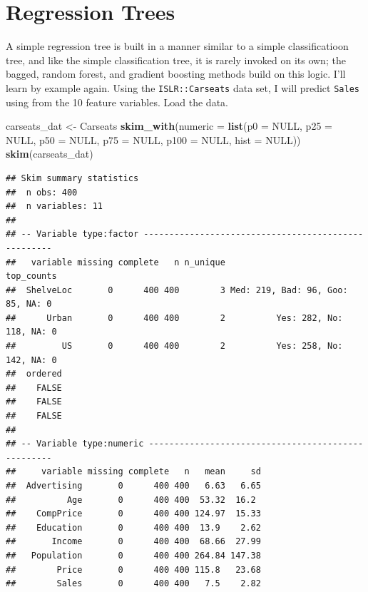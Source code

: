 \documentclass[]{book}
\newenvironment{Shaded}{\begin{snugshade}}{\end{snugshade}}
\newcommand{\DataTypeTok}[1]{\textcolor[rgb]{0.13,0.29,0.53}{#1}}
\newcommand{\KeywordTok}[1]{\textcolor[rgb]{0.13,0.29,0.53}{\textbf{#1}}}
\newcommand{\NormalTok}[1]{#1}
\newcommand{\OtherTok}[1]{\textcolor[rgb]{0.56,0.35,0.01}{#1}}
\newcommand{\StringTok}[1]{\textcolor[rgb]{0.31,0.60,0.02}{#1}}
\begin{document}
\hypertarget{regression-trees}{%
\section{Regression Trees}\label{regression-trees}}

A simple regression tree is built in a manner similar to a simple classificatioon tree, and like the simple classification tree, it is rarely invoked on its own; the bagged, random forest, and gradient boosting methods build on this logic. I'll learn by example again. Using the \texttt{ISLR::Carseats} data set, I will predict \texttt{Sales} using from the 10 feature variables. Load the data.

\begin{Shaded}
\begin{Highlighting}[]
\NormalTok{carseats_dat <-}\StringTok{ }\NormalTok{Carseats}
\KeywordTok{skim_with}\NormalTok{(}\DataTypeTok{numeric =} \KeywordTok{list}\NormalTok{(}\DataTypeTok{p0 =} \OtherTok{NULL}\NormalTok{, }\DataTypeTok{p25 =} \OtherTok{NULL}\NormalTok{, }\DataTypeTok{p50 =} \OtherTok{NULL}\NormalTok{, }\DataTypeTok{p75 =} \OtherTok{NULL}\NormalTok{, }
                                \DataTypeTok{p100 =} \OtherTok{NULL}\NormalTok{, }\DataTypeTok{hist =} \OtherTok{NULL}\NormalTok{))}
\KeywordTok{skim}\NormalTok{(carseats_dat)}
\end{Highlighting}
\end{Shaded}

\begin{verbatim}
## Skim summary statistics
##  n obs: 400 
##  n variables: 11 
## 
## -- Variable type:factor ----------------------------------------------------
##   variable missing complete   n n_unique                        top_counts
##  ShelveLoc       0      400 400        3 Med: 219, Bad: 96, Goo: 85, NA: 0
##      Urban       0      400 400        2          Yes: 282, No: 118, NA: 0
##         US       0      400 400        2          Yes: 258, No: 142, NA: 0
##  ordered
##    FALSE
##    FALSE
##    FALSE
## 
## -- Variable type:numeric ---------------------------------------------------
##     variable missing complete   n   mean     sd
##  Advertising       0      400 400   6.63   6.65
##          Age       0      400 400  53.32  16.2 
##    CompPrice       0      400 400 124.97  15.33
##    Education       0      400 400  13.9    2.62
##       Income       0      400 400  68.66  27.99
##   Population       0      400 400 264.84 147.38
##        Price       0      400 400 115.8   23.68
##        Sales       0      400 400   7.5    2.82
\end{verbatim}
\end{document}
